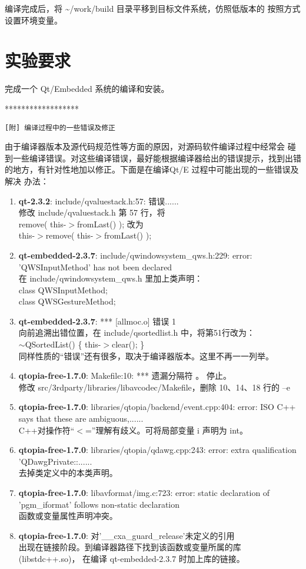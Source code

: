 编译完成后，将 \textasciitilde/work/build 目录平移到目标文件系统，仿照低版本的
按照方式设置环境变量。

\section{实验要求}
完成一个 Qt/Embedded 系统的编译和安装。

\newpage
\begin{center} ****************** \end{center}
\tt [附] 编译过程中的一些错误及修正

由于编译器版本及源代码规范性等方面的原因，对源码软件编译过程中经常会
碰到一些编译错误。对这些编译错误，最好能根据编译器给出的错误提示，找到出错
的地方，有针对性地加以修正。下面是在编译Qt/E 过程中可能出现的一些错误及解决
办法：
\begin{enumerate}
  \item {\bf qt-2.3.2}: include/qvaluestack.h:57: 错误......\\
		修改 include/qvaluestack.h 第 57 行，将\\
		remove( this-$>$fromLast() ); 改为\\
		this-$>$remove( this-$>$fromLast() );
  \item {\bf qt-embedded-2.3.7}: include/qwindowsystem\_qws.h:229: error:
		'QWSInputMethod' has not been declared\\
		在 include/qwindowsystem\_qws.h 里加上类声明：\\
		class   QWSInputMethod;\\
		class   QWSGestureMethod;
  \item {\bf qt-embedded-2.3.7}: *** [allmoc.o] 错误 1\\
		向前追溯出错位置，在 include/qsortedlist.h 中，将第51行改为：\\
		$\sim$QSortedList() \{ this-$>$clear(); \}\\
		同样性质的``错误''还有很多，取决于编译器版本。这里不再一一列举。
  \item {\bf qtopia-free-1.7.0}: Makefile:10: *** 遗漏分隔符 。 停止。\\
		修改 src/3rdparty/libraries/libavcodec/Makefile，删除 10、14、18
		行的 --e
  \item {\bf qtopia-free-1.7.0}: libraries/qtopia/backend/event.cpp:404:
		error: ISO C++ says that these are ambiguous,......\\
		C++对操作符``$<$=''理解有歧义。可将局部变量 i 声明为 int。
  \item {\bf qtopia-free-1.7.0}: libraries/qtopia/qdawg.cpp:243: error:
		extra qualification 'QDawgPrivate::......\\
		去掉类定义中的本类声明。
  \item {\bf qtopia-free-1.7.0}: libavformat/img.c:723: error: static
		declaration of 'pgm\_iformat' follows non-static declaration\\
		函数或变量属性声明冲突。
  \item {\bf qtopia-free-1.7.0}: 对'\_\_cxa\_guard\_release'未定义的引用\\
		出现在链接阶段。到编译器路径下找到该函数或变量所属的库(libstdc++.so)，
		在编译 qt-embedded-2.3.7 时加上库的链接。
\end{enumerate}
\rm\normalsize
